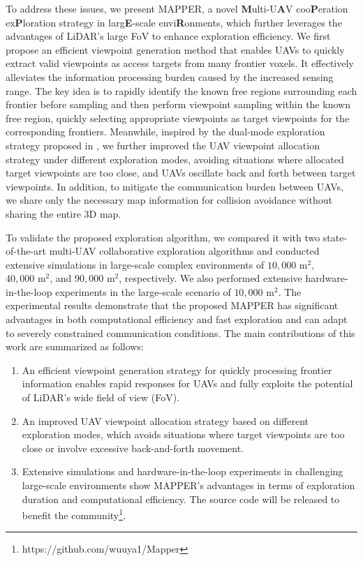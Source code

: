 \documentclass[letterpaper, 10pt, journal, twoside]{support/IEEEtran}
\begin{document}
To address these issues, we present {MAPPER}, a novel \textbf{M}ulti-U\textbf{A}V coo\textbf{P}eration ex\textbf{P}loration strategy in larg\textbf{E}-scale envi\textbf{R}onments, which further leverages the advantages of LiDAR's large FoV to enhance exploration efficiency. 
We first propose an efficient viewpoint generation method that enables UAVs to quickly extract valid viewpoints as access targets from many frontier voxels. It effectively alleviates the information processing burden caused by the increased sensing range. The key idea is to rapidly identify the known free regions surrounding each frontier before sampling and then perform viewpoint sampling within the known free region, quickly selecting appropriate viewpoints as target viewpoints for the corresponding frontiers. Meanwhile, inspired by the dual-mode exploration strategy proposed in \cite{bartolomei2023fast}, we further improved the UAV viewpoint allocation strategy under different exploration modes, avoiding situations where allocated target viewpoints are too close, and UAVs oscillate back and forth between target viewpoints. In addition, to mitigate the communication burden between UAVs, we share only the necessary map information for collision avoidance without sharing the entire 3D map.

To validate the proposed exploration algorithm, we compared it with two state-of-the-art multi-UAV collaborative exploration algorithms and conducted extensive simulations in large-scale complex environments of $10{,}000\text{ m}^2$, $40{,}000\text{ m}^2$, and $90{,}000\text{ m}^2$, respectively. We also performed extensive hardware-in-the-loop experiments in the large-scale scenario of $10{,}000\text{ m}^2$. The experimental results demonstrate that the proposed MAPPER has significant advantages in both computational efficiency and fast exploration and can adapt to severely constrained communication conditions. The main contributions of this work are summarized as follows:
\begin{enumerate}
  \item An efficient viewpoint generation strategy for quickly processing frontier information enables rapid responses for UAVs and fully exploits the potential of LiDAR's wide field of view (FoV).
  \item An improved UAV viewpoint allocation strategy based on different exploration modes, which avoids situations where target viewpoints are too close or involve excessive back-and-forth movement.
  \item Extensive simulations and hardware-in-the-loop experiments in challenging large-scale environments show MAPPER's advantages in terms of exploration duration and computational efficiency. The source code will be released to benefit the community\footnote{https://github.com/wuuya1/Mapper}.
\end{enumerate}
\end{document}
